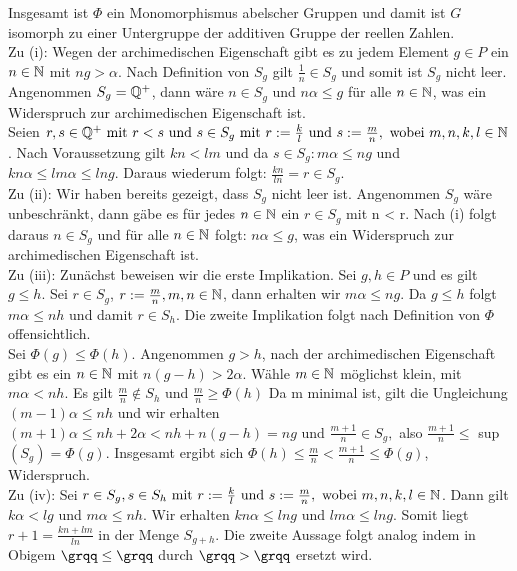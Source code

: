 {\begin{enumerate}
\end{enumerate}
Insgesamt ist $\Phi$ ein Monomorphismus abelscher Gruppen und damit ist $G$ isomorph zu einer Untergruppe der additiven Gruppe der reellen Zahlen.\\ 
Zu (i): Wegen der archimedischen Eigenschaft gibt es zu jedem Element $g \in P$ ein $n \in \mathbb{N}$ mit $ng > \alpha$. Nach Definition von $S_g$ gilt $\frac{1}{n} \in S_g$ und somit ist $S_g$ nicht leer.\\ Angenommen $S_g = \mathbb{Q}^{+}$, dann wäre $n \in S_g$ und $n\alpha \le g$ für alle $n\in\mathbb{N}$, was ein Widerspruch zur archimedischen Eigenschaft ist.\\
Seien $r, s \in \mathbb{Q}^{+} \text{ mit } r < s \text{ und } s \in S_g \text { mit } r := \frac{k}{l} \text{ und } s:= \frac{m}{n}, \text{ wobei } m, n ,k, l \in \mathbb{N}$. Nach Voraussetzung gilt $kn < lm $ und da $s \in S_g: m\alpha \le ng$ und $kn\alpha \le lm\alpha \le lng.$ Daraus wiederum folgt: $\frac{kn}{ln} = r \in S_g$.\\
Zu (ii): Wir haben bereits gezeigt, dass $S_g$ nicht leer ist. Angenommen $S_g$ wäre unbeschränkt, dann gäbe es für jedes $n \in \mathbb{N}$ ein $r \in S_g$ mit n < r. Nach (i) folgt daraus $n \in S_g$ und für alle $n \in \mathbb{N}$ folgt: $ n\alpha \le g$, was ein Widerspruch zur archimedischen Eigenschaft ist.\\
Zu (iii): Zunächst beweisen wir die erste Implikation. Sei  $g, h \in P$ und es gilt $g \le h$. Sei $r \in S_g$, $r:= \frac{m}{n}, m, n \in \mathbb{N} $, dann erhalten wir $m\alpha \le ng$. Da $g \le h$ folgt $ m\alpha \le n h$ und damit $r \in S_h$. Die zweite Implikation folgt nach Definition von $\Phi$ offensichtlich.\\
Sei $\Phi\left(g\right) \le \Phi\left(h\right)$. Angenommen $g > h$, nach der archimedischen Eigenschaft gibt es ein $ n \in \mathbb{N}$ mit $n\left(g-h\right) > 2\alpha$. Wähle $m \in \mathbb{N}$ möglichst klein, mit $m\alpha < nh$. Es gilt $\frac{m}{n} \notin S_h$ und $\frac{m}{n} \geq \Phi\left(h\right)$
Da m minimal ist, gilt die Ungleichung $\left(m-1\right)\alpha \le nh$ und wir erhalten $ \left(m+1\right)\alpha \le nh + 2\alpha < nh + n(g-h) = ng$ und $\frac{m+1}{n} \in S_g,$ also $\frac{m+1}{n} \leq$ sup$\left(S_g\right) = \Phi\left(g\right)$. Insgesamt ergibt sich $\Phi\left(h\right) \le \frac{m}{n} < \frac{m + 1}{n} \le \Phi\left(g\right)$, Widerspruch.\\
Zu (iv): Sei $r \in S_g, s \in S_h \text{ mit } r := \frac{k}{l} \text{ und } s:= \frac{m}{n}, \text{ wobei } m, n ,k, l \in \mathbb{N}$. Dann gilt $k\alpha < lg $ und $ m\alpha \le nh$. Wir erhalten $kn\alpha \le lng \text{ und } lm\alpha \le lng.$ Somit liegt $r+1 = \frac{kn+lm}{ln}$ in der Menge $S_{g+h}.$ Die zweite Aussage folgt analog indem in Obigem $\grqq \le\grqq$ durch $\grqq>\grqq$ ersetzt wird.\\
}
